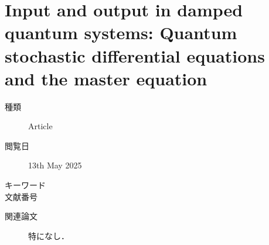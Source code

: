 \documentclass{report}
\begin{document}
  \maketitle
  \tableofcontents
  \chapter{Input and output in damped quantum systems: Quantum stochastic differential equations and the master equation}
    \begin{boxnote}
      \begin{description}
        \item[種類] Article
        \item[閲覧日] 13th May 2025
        \item[キーワード] 
        \item[文献番号] \cite{PhysRevA.31.3761}
        \item[関連論文] 特になし．
      \end{description}
    \end{boxnote}
\end{document}
